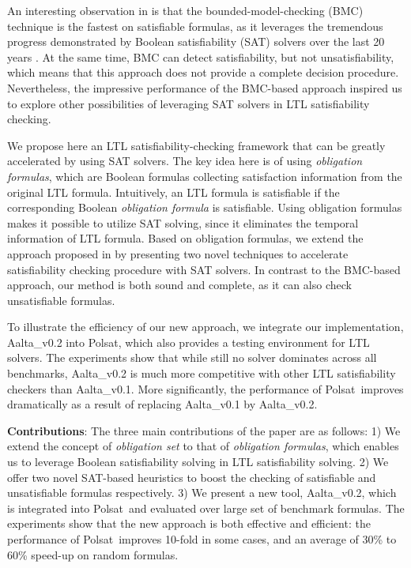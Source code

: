 \documentclass[conference]{IEEEtran}
\def\Polsat{{Polsat}}
\def\Aalta{{Aalta}}
\begin{document}
An interesting observation in \cite{LPZVHCoRR13} is that the 
bounded-model-checking (BMC) technique \cite{CBRZ01} is the fastest 
on satisfiable formulas, as it leverages the tremendous progress 
demonstrated by Boolean satisfiability (SAT) solvers over the last 20 years 
\cite{MZ09}.  At the same time, BMC can detect satisfiability, but not 
unsatisfiability, which means that this approach does not provide a 
complete decision procedure. Nevertheless, the impressive performance of the
BMC-based approach inspired us to explore other possibilities of leveraging 
SAT solvers in LTL satisfiability checking.

We propose here an LTL satisfiability-checking framework that can be greatly
accelerated by using SAT solvers. The key idea here is of using
\emph{obligation formulas}, which are Boolean formulas
collecting satisfaction information from the original LTL
formula.  Intuitively, an LTL formula is satisfiable if the
corresponding Boolean \emph{obligation formula} is satisfiable. 
Using obligation formulas makes it possible to utilize SAT solving, 
since it eliminates the temporal information of LTL formula. Based on
obligation formulas, we extend the approach proposed in \cite{LZPVH13}
by presenting two novel techniques to accelerate satisfiability
checking procedure with SAT solvers.  In contrast to the BMC-based approach,
our method is both sound and complete, as it can also check unsatisfiable 
formulas.

To illustrate the efficiency of our new approach, we integrate our
implementation, \Aalta\_v0.2 into \Polsat, which also provides a
testing environment for LTL solvers.  The experiments show that 
while still no solver dominates across all benchmarks,  \Aalta\_v0.2
is much more competitive with other LTL satisfiability checkers than
\Aalta\_v0.1. More significantly, the performance of \Polsat\ improves 
dramatically as a result of replacing  \Aalta\_v0.1 by  \Aalta\_v0.2.

\noindent
\textbf{Contributions}: The three main contributions of the paper are as 
follows: 1) We extend the concept of \emph{obligation set} to that of
\textit{obligation formulas}, which enables us to leverage Boolean
satisfiability solving in LTL satisfiability solving.
2) We offer two novel SAT-based heuristics to boost the checking of 
satisfiable and unsatisfiable formulas respectively. 
3) We present a new tool, \Aalta\_v0.2, which is integrated into \Polsat\ 
and evaluated over large set of benchmark formulas. The experiments show 
that the new approach is both effective and efficient: the performance of
\Polsat\ improves 10-fold in some cases, and an average of 30\% to 60\% 
speed-up on random formulas.
\end{document}
